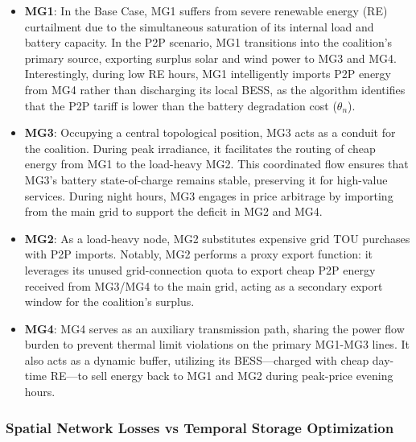 \documentclass[preprint,12pt]{elsarticle}
\begin{document}
    \begin{itemize}
        \item \textbf{MG1}: In the Base Case, MG1 suffers from severe renewable energy (RE) curtailment due to the simultaneous saturation of its internal load and battery capacity. In the P2P scenario, MG1 transitions into the coalition's primary source, exporting surplus solar and wind power to MG3 and MG4. Interestingly, during low RE hours, MG1 intelligently imports P2P energy from MG4 rather than discharging its local BESS, as the algorithm identifies that the P2P tariff is lower than the battery degradation cost ($\theta_n$).
        \item \textbf{MG3}: Occupying a central topological position, MG3 acts as a conduit for the coalition. During peak irradiance, it facilitates the routing of cheap energy from MG1 to the load-heavy MG2. This coordinated flow ensures that MG3's battery state-of-charge remains stable, preserving it for high-value services. During night hours, MG3 engages in price arbitrage by importing from the main grid to support the deficit in MG2 and MG4.
        \item \textbf{MG2}: As a load-heavy node, MG2 substitutes expensive grid TOU purchases with P2P imports. Notably, MG2 performs a proxy export function: it leverages its unused grid-connection quota to export cheap P2P energy received from MG3/MG4 to the main grid, acting as a secondary export window for the coalition's surplus.
        \item \textbf{MG4}: MG4 serves as an auxiliary transmission path, sharing the power flow burden to prevent thermal limit violations on the primary MG1-MG3 lines. It also acts as a dynamic buffer, utilizing its BESS—charged with cheap day-time RE—to sell energy back to MG1 and MG2 during peak-price evening hours.
    \end{itemize}

    \subsubsection{Spatial Network Losses vs Temporal Storage Optimization}
\end{document}
